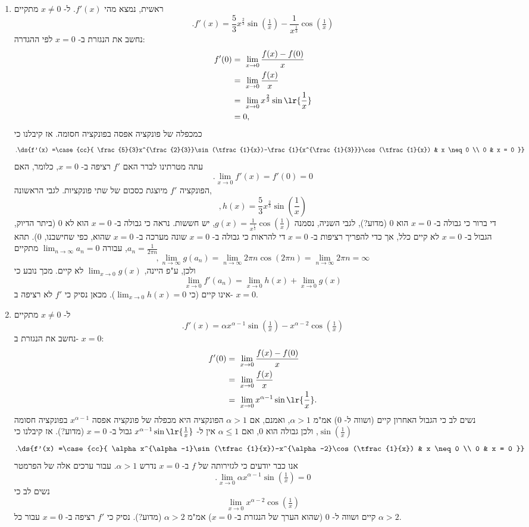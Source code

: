 \ifsol
\begin{solbox}
\begin{enumerate}
\item
ראשית, נמצא מהי
$f'(x)$.
ל-
$x\neq0$
מתקיים
    $$.f'(x)= \frac{5}{3}x^{\frac{2}{3}}\sin(\tfrac{1}{x})-\frac{1}{x^{\frac{1}{3}}}\cos(\tfrac{1}{x})$$
נחשב את הנגזרת ב-
$x=0$
לפי ההגדרה:
\begin{align*}
    f'(0)&=\ \lim_{x\to 0}\frac{f(x)-f(0)}{x}\\
    &=\ \lim_{x\to0}\frac{f(x)}{x}\\
    &=\ \lim_{x\to0}x^{\frac{2}{3}} \sin\lr{\frac{1}{x}}\\
    &=0,
\end{align*}
כמכפלה של פונקציה אפסה בפונקציה חסומה.
אז קיבלנו כי
$$.\ds{f'(x) =\case{cc}{ \frac{5}{3}x^{\frac{2}{3}}\sin(\tfrac{1}{x})-\frac{1}{x^{\frac{1}{3}}}\cos(\tfrac{1}{x}) & x \neq 0 \\ 0 & x = 0 }}$$
עתה מטרתינו לברר האם
$f'$
רציפה ב-
$x=0$,
כלומר,
האם
$$.\lim_{x\to 0}f'(x)=f'(0)=0$$
הפונקציה
$f'$
מיוצגת כסכום של שתי פונקציות. לגבי הראשונה,
$$,h(x)=\frac{5}{3}x^{\frac{2}{3}}\sin\left(\frac{1}{x}\right)$$
די ברור כי גבולה ב-
$x=0$
הוא
$0$
(מדוע?),
לגבי השניה,
נסמנה
$g(x)=\frac{1}{x^{\frac{1}{3}}}\cos(\tfrac{1}{x})$,
יש חששות. נראה כי גבולה ב-
$x=0$
הוא
לא
$0$
(ביתר הדיוק, הגבול ב-
$x=0$
לא קיים כלל, אך כדי להפריך רציפות ב-
$x=0$
די להראות כי גבולה ב-
$x=0$
שונה מערכה ב-
$x=0$
שהוא, כפי שחישבנו,
$0$).
תהא
$a_n=\frac{1}{2\pi n}$,
עבורה
$\displaystyle\lim_{n\to\infty}a_n=0$
מתקיים
$$,\lim_{n\to\infty}g(a_n)=\lim_{n\to\infty}2\pi n\cos(2\pi n)=\lim_{n\to\infty}2\pi n=\infty$$
ולכן, ע"פ היינה,
$\displaystyle\lim_{x\to 0}g(x)$
לא קיים.
מכך נובע כי
$$\lim_{x\to 0}f'(a_n)=\lim_{x\to0}h(x)+\lim_{x\to0}g(x)$$
אינו קיים
(כי
$\displaystyle\lim_{x\to0}h(x)=0$).
מכאן נסיק כי
$f'$
לא רציפה ב-
$x=0$.

    \item
   ל-
   $x\neq 0$
   מתקיים
   $$.f'(x)= \alpha x^{\alpha-1}\sin(\tfrac{1}{x})-x^{\alpha-2}\cos(\tfrac{1}{x})$$
נחשב את הנגזרת ב-
$x=0$:
   \begin{align*}
    f'(0)&=\ \lim_{x\to 0}\frac{f(x)-f(0)}{x}\\
    &=\ \lim_{x\to0}\frac{f(x)}{x}\\
    &=\ \lim_{x\to0}x^{\alpha-1} \sin\lr{\frac{1}{x}}.
\end{align*}
נשים לב כי הגבול האחרון קיים
(ושווה ל-
$0$)
אמ"מ
$\alpha>1$,
ואמנם, אם
$\alpha>1$
הפונקציה היא מכפלה של פונקציה אפסה
$x^{\alpha-1}$
בפונקציה חסומה
$\sin(\tfrac{1}{x})$,
ולכן גבולה הוא
$0$,
ואם
$\alpha\leq1$
אין ל-
$x^{\alpha-1} \sin\lr{\frac{1}{x}}$
גבול ב-
$x=0$
(מדוע?).
אז קיבלנו כי
$$.\ds{f'(x) =\case{cc}{ \alpha x^{\alpha-1}\sin(\tfrac{1}{x})-x^{\alpha-2}\cos(\tfrac{1}{x}) & x \neq 0 \\ 0 & x = 0 }}$$
אנו כבר יודעים כי לגזירותה של
$f$
ב-
$x=0$
נדרש
$\alpha>1$.
עבור ערכים אלה של הפרמטר
$$.\lim_{x\to0}\alpha x^{\alpha-1}\sin(\tfrac{1}{x})=0$$
נשים לב כי
$$\lim_{x\to0}x^{\alpha-2}\cos(\tfrac{1}{x})$$
קיים ושווה ל-
$0$
(שהוא הערך של הנגזרת ב-
$x=0$)
אמ"מ
$\alpha>2$
(מדוע?).
נסיק כי
$f'$
רציפה ב-
$x=0$
עבור כל
$\alpha>2$.
\end{enumerate}
\end{solbox}
\fi
